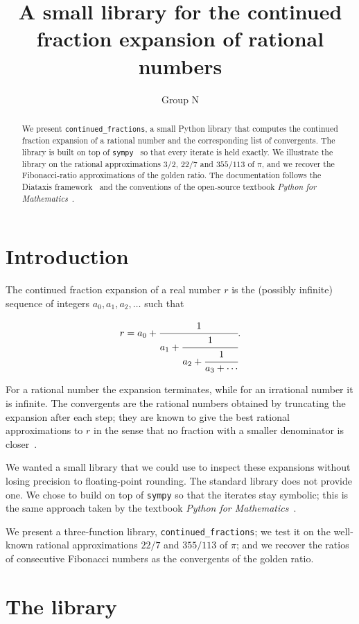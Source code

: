 \documentclass[11pt]{article}
\title{A small library for the continued fraction expansion of rational
       numbers}
\author{Group N}
\date{}
\begin{document}
\maketitle

\begin{abstract}
We present \texttt{continued\_fractions}, a small Python library that
computes the continued fraction expansion of a rational number and the
corresponding list of convergents. The library is built on top of
\texttt{sympy}~\cite{meurer2017} so that every iterate is held exactly.
We illustrate the library on the rational approximations \(3/2\),
\(22/7\) and \(355/113\) of \(\pi\), and we recover the Fibonacci-ratio
approximations of the golden ratio. The documentation follows the
Diataxis framework~\cite{procida2017} and the conventions of the
open-source textbook \emph{Python for Mathematics}~\cite{knight2024}.
\end{abstract}

\section{Introduction}

The continued fraction expansion of a real number \(r\) is the (possibly
infinite) sequence of integers \(a_0, a_1, a_2, \dots\) such that

\[
    r = a_0 + \cfrac{1}{a_1 + \cfrac{1}{a_2 + \cfrac{1}{a_3 + \cdots}}}.
\]

For a rational number the expansion terminates, while for an irrational
number it is infinite. The convergents are the rational numbers obtained
by truncating the expansion after each step; they are known to give the
best rational approximations to \(r\) in the sense that no fraction with a
smaller denominator is closer~\cite{khinchin1964}.

We wanted a small library that we could use to inspect these expansions
without losing precision to floating-point rounding. The standard
library does not provide one. We chose to build on top of \texttt{sympy}
so that the iterates stay symbolic; this is the same approach taken by
the textbook \emph{Python for Mathematics}~\cite{knight2024}.

We present a three-function library,
\texttt{continued\_fractions}; we test it on the well-known rational
approximations \(22/7\) and \(355/113\) of \(\pi\); and we recover the
ratios of consecutive Fibonacci numbers as the convergents of the
golden ratio.

\section{The library}
\end{document}
